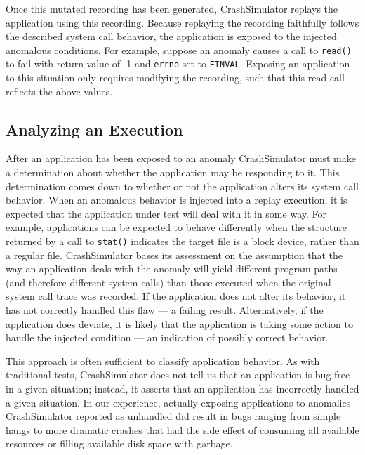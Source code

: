 Once this mutated recording has been generated, CrashSimulator replays the
application using this recording.
Because replaying the
recording faithfully follows the described system call behavior, the
application is exposed to the injected
anomalous conditions.  For
example, suppose an anomaly causes a call to {\tt read()} to fail with
return value of -1 and {\tt errno} set to {\tt EINVAL}.  Exposing an
application to this situation only requires modifying the recording,
such that this read call reflects the above values.

\subsection{Analyzing an Execution}

After an application has been exposed to an anomaly CrashSimulator must
make a determination about whether the application may be responding to it.
This determination comes down to whether or not
the application alters its
system call behavior.  When an anomalous
behavior is injected into a replay execution,
it is expected that the application under
test will deal with it in some way.  For example, applications can
be expected to behave differently when the structure returned by a call to
{\tt stat()} indicates the target file is a block device,
rather than a regular
file.  CrashSimulator bases its assessment on the assumption that the way
an
application deals with the anomaly will yield
different program paths (and therefore different system calls) than
those
executed when the original system call trace was recorded.
If the application
does not alter its behavior, it has not
correctly handled this flaw --- a failing result.  Alternatively, if the
application does deviate, it is likely that the application is taking some
action to handle the injected condition --- an indication of possibly
correct behavior.

This approach is often sufficient to classify application behavior.  As
with traditional tests, CrashSimulator does not tell us that an application
is bug free in a given situation; instead, it asserts that an application
has incorrectly handled a given situation.  In our experience, actually
exposing applications to anomalies CrashSimulator reported as unhandled
did result
in bugs ranging from simple hangs to more dramatic crashes that
had the side effect of consuming all available resources or filling
available disk space with garbage.

